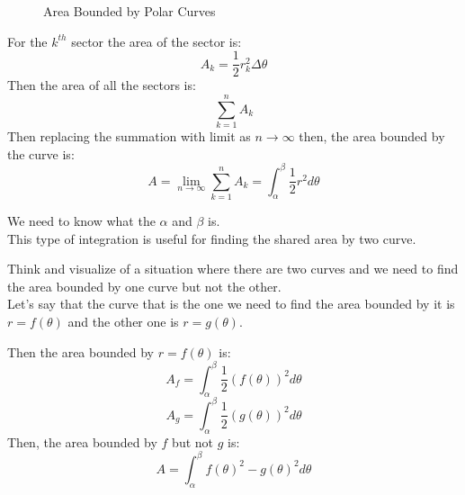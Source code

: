 \begin{figure}[H]
  \caption{Area Bounded by Polar Curves}
  \label{fig:area-bounded-by-polar-curves}
\end{figure}

For the \(k^{th}\) sector the area of the sector is:
\[ A_{k} = \frac{1}{2} r_{k}^2\Delta\theta \]
Then the area of all the sectors is:
\[\sum_{k=1}^{n} A_{k}\]
Then replacing the summation with limit as \(n\to \infty\) then, the area
bounded by the curve is:
\[ A = \lim_{n \to \infty} \sum_{k=1}^{n} A_{k} =\int_{\alpha}^{\beta}
\frac{1}{2}r^2d\theta \] 

\begin{remark}
  We need to know what the \(\alpha\) and \(\beta\) is.\\
  This type of integration is useful for finding the shared area by two curve.
\end{remark}

Think and visualize of a situation where there are two curves and we need to
find the area bounded by one curve but not the other.\\
Let's say that the curve that is the one we need to find the area bounded by it
is \(r=f(\theta)\) and the other one is \(r=g(\theta)\).

Then the area bounded by \(r=f(\theta)\) is:
\[ A_{f} = \int_{\alpha}^{\beta} \frac{1}{2} (f(\theta))^2 d\theta \] 
\[ A_{g} = \int_{\alpha}^{\beta} \frac{1}{2} (g(\theta))^2 d\theta \] 
Then, the area bounded by \(f\) but not \(g\) is:
\[ A = \int_{\alpha}^{\beta} f(\theta)^2 - g(\theta)^2 d\theta \]
